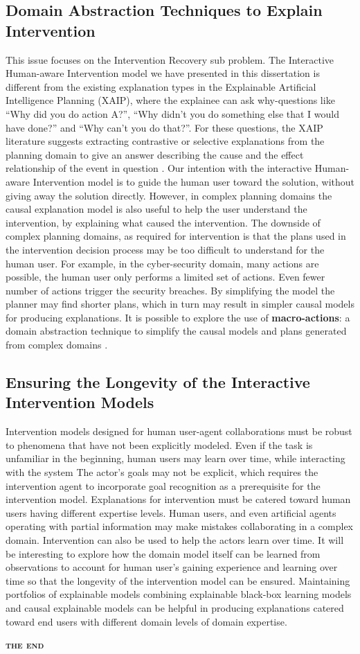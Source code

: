 \subsection{Domain Abstraction Techniques to Explain Intervention}
This issue focuses on the Intervention Recovery sub problem.
The Interactive Human-aware Intervention model we have presented in this dissertation is different from the existing explanation types in the Explainable Artificial Intelligence Planning (XAIP), where the explainee can ask why-questions like ``Why did you do action A?'', ``Why didn't you do something else that I would have done?'' and ``Why can't you do that?''.
For these questions, the XAIP literature suggests extracting contrastive or selective explanations from the planning domain to give an answer describing the cause and the effect relationship of the event in question \cite{miller2017}.
Our intention with the interactive Human-aware Intervention model is to guide the human user toward the solution, without giving away the solution directly.
However, in complex planning domains the causal explanation model is also useful to help the user understand the intervention, by explaining what caused the intervention.
The downside of complex planning domains, as required for intervention is that the plans used in the intervention decision process may be too difficult to understand for the human user.
For example, in the cyber-security domain, many actions are possible, the human user only performs a limited set of actions.
Even fewer number of actions trigger the security breaches.
By simplifying the model the planner may find shorter plans, which in turn may result in simpler causal models for producing explanations.
It is possible to explore the use of \textbf{macro-actions}: a domain abstraction technique to simplify the causal models and plans generated from complex domains \cite{macro207}.

\subsection{Ensuring the Longevity of the Interactive Intervention Models}
Intervention models designed for human user-agent collaborations must be robust to phenomena that have not been explicitly modeled.
Even if the task is unfamiliar in the beginning, human users may learn over time, while interacting with the system
The actor's goals may not be explicit, which requires the intervention agent to incorporate goal recognition as a prerequisite for the intervention model.
Explanations for intervention must be catered toward human users having different expertise levels.
Human users, and even artificial agents operating with partial information may make mistakes collaborating in a complex domain.
Intervention can also be used to help the actors learn over time.
It will be interesting to explore how the domain model itself can be learned from observations to account for human user's gaining experience and learning over time so that the longevity of the intervention model can be ensured.
Maintaining portfolios of explainable models combining explainable black-box learning models and causal explainable models can be helpful in producing explanations catered toward end users with different domain levels of domain expertise.


\begin{center}
\textbf{\textsc{the end}}
\end{center}